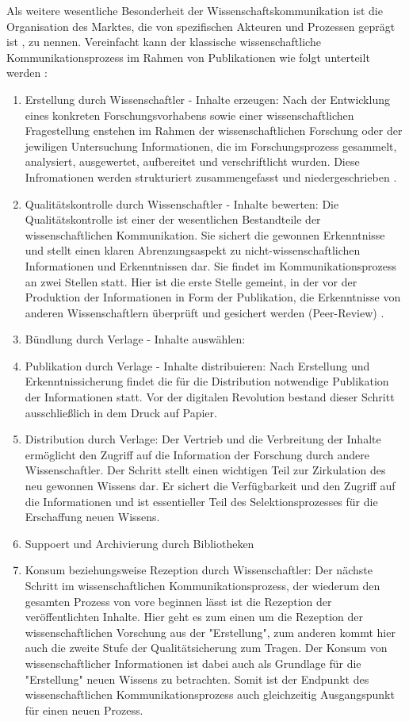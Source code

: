 Als weitere wesentliche Besonderheit der Wissenschaftskommunikation ist die Organisation des Marktes, die von spezifischen Akteuren und Prozessen geprägt ist \cite{Hess_2006}, zu nennen. Vereinfacht kann der klassische wissenschaftliche Kommunikationsprozess im Rahmen von Publikationen wie folgt unterteilt werden\cite{cite:11b} \cite{Hess_2006}:
\begin{enumerate}
\item Erstellung durch Wissenschaftler - Inhalte erzeugen: 
Nach der Entwicklung eines konkreten Forschungsvorhabens sowie einer wissenschaftlichen Fragestellung enstehen im Rahmen der wissenschaftlichen Forschung oder der jewiligen Untersuchung Informationen\cite{cite:11c}, die im Forschungsprozess gesammelt, analysiert, ausgewertet, aufbereitet und verschriftlicht wurden\cite{cite:11d}. Diese Infromationen werden strukturiert zusammengefasst und niedergeschrieben \cite{Hess_2006}.
\item Qualitätskontrolle durch Wissenschaftler - Inhalte bewerten: 
Die Qualitätskontrolle ist einer der wesentlichen Bestandteile der wissenschaftlichen Kommunikation. Sie sichert die gewonnen Erkenntnisse\cite{cite:11e} und stellt einen klaren Abrenzungsaspekt zu nicht-wissenschaftlichen Informationen und Erkenntnissen dar\cite{cite:11f}. Sie findet im Kommunikationsprozess an zwei Stellen statt. Hier ist die erste Stelle gemeint, in der vor der Produktion der Informationen in Form der Publikation, die Erkenntnisse von anderen Wissenschaftlern überprüft und gesichert werden (Peer-Review) \cite{Hess_2006}.
\item Bündlung durch Verlage - Inhalte auswählen:
\item Publikation durch Verlage - Inhalte distribuieren: 
Nach Erstellung und Erkenntnissicherung findet die für die Distribution notwendige Publikation der Informationen statt. Vor der digitalen Revolution bestand dieser Schritt ausschließlich in dem Druck auf Papier.\cite{cite:11h}
\item Distribution durch Verlage: 
Der Vertrieb und die Verbreitung der Inhalte ermöglicht den Zugriff auf die Information der Forschung durch andere Wissenschaftler. Der Schritt stellt einen wichtigen Teil zur Zirkulation des neu gewonnen Wissens dar\cite{cite:11i}. Er sichert die Verfügbarkeit und den Zugriff auf die Informationen und ist essentieller Teil des Selektionsprozesses für die Erschaffung neuen Wissens.\cite{cite:11l}
\item Suppoert und Archivierung durch Bibliotheken
\item Konsum beziehungsweise Rezeption durch Wissenschaftler: 
Der nächste Schritt im wissenschaftlichen Kommunikationsprozess, der wiederum den gesamten Prozess von vore beginnen lässt ist die Rezeption der veröffentlichten Inhalte. Hier geht es zum einen um die Rezeption der wissenschaftlichen Vorschung aus der "Erstellung", zum anderen kommt hier auch die zweite Stufe der Qualitätsicherung zum Tragen.\cite{cite:11j} Der Konsum von wissenschaftlicher Informationen ist dabei auch als Grundlage für die "Erstellung" neuen Wissens zu betrachten. Somit ist der Endpunkt des wissenschaftlichen Kommunikationsprozess auch gleichzeitig Ausgangspunkt für einen neuen Prozess\cite{cite:11k}.
\end{enumerate}

